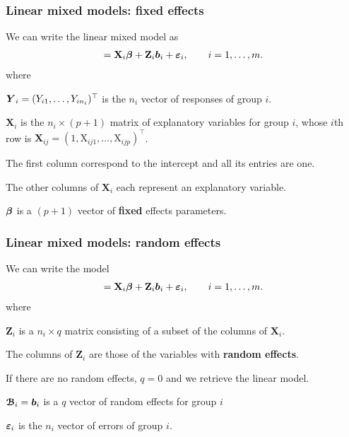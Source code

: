 \documentclass{beamer}
\begin{document}
\begin{frame}\frametitle{Linear mixed models: fixed effects}


We can write the linear mixed model as
\begin{align*}
[\bs{Y}_i \mid \bs{\mathcal{B}}_i=\bs{b}_i]= \mathbf{X}_i \bs{\beta} + \mathbf{Z}_i \bs{b}_i + \bs{\eps}_i, \qquad i = 1, \ldots, m.
\end{align*} 
where
\bi
\item $\boldsymbol {Y}_i=(Y_{i1},\ldots,Y_{in_i})^{\top}$ is the $n_i$ vector of responses of group $i$.

\item $\mathbf{X}_i$ is the $n_i \times (p+1)$ matrix of explanatory variables for group $i$, whose $i$th row is $\mathbf{X}_{ij}=(1,\mathrm{X}_{ij1},\ldots,\mathrm{X}_{ijp})^{\top}$. 
\bi 
\item The first column correspond to the intercept and all its entries are one.
\item The other columns of $\mathbf{X}_i$ each represent an explanatory variable.
\ei
\item $\boldsymbol {\beta}$ is a $(p+1)$ vector of \textbf{fixed} effects parameters.
\ei
\end{frame}

\begin{frame}\frametitle{Linear mixed models: random effects}
We can write the model
\begin{align*}
[\bs{Y}_i \mid \bs{\mathcal{B}}_i=\bs{b}_i]= \mathbf{X}_i \bs{\beta} + \mathbf{Z}_i \bs{b}_i + \bs{\eps}_i, \qquad i = 1, \ldots, m.
\end{align*} 
where
\bi
\item $\mathbf{Z}_i$ is a $n_i \times q$ matrix consisting of a subset of the columns of $\mathbf{X}_i$. 
\bi \item The columns of $\mathbf{Z}_i$ are those of the variables with \textbf{random effects}. 
\item If there are no random effects, $q=0$ and we retrieve the linear model.
\ei
\item  $\boldsymbol {\mathcal{B}}_i=\boldsymbol {b}_i$ is a $q$ vector of random effects for group $i$
\item $\boldsymbol {\varepsilon}_i$ is the $n_i$ vector of errors of group $i$.
\ei

\end{frame}
\end{document}

